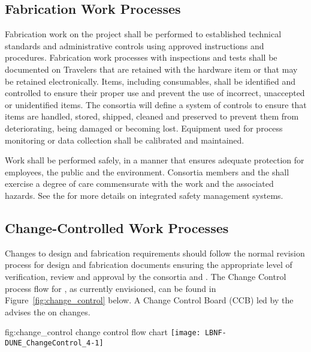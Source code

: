 \subsection{Fabrication Work Processes}

Fabrication work on the  project shall be performed to
established technical standards and administrative controls using
approved instructions and procedures. Fabrication work processes with
 inspections and tests shall be documented on Travelers that
are retained with the hardware item or that may be retained
electronically. Items, including consumables, shall be identified and
controlled to ensure their proper use and prevent the use of
incorrect, unaccepted or unidentified items. The consortia will define
a system of controls to ensure that items are handled, stored,
shipped, cleaned and preserved to prevent them from deteriorating,
being damaged or becoming lost. Equipment used for process monitoring
or data collection shall be calibrated and maintained.

Work shall be performed safely, in a manner that ensures adequate
protection for employees, the public and the environment. Consortia
members and the   shall exercise a degree of
care commensurate with the work and the associated hazards. See the
  for more details on
 integrated safety management systems.

\subsection{Change-Controlled Work Processes}
\label{sec:change-control}

Changes to design and fabrication requirements should follow the
normal revision process for design and fabrication documents ensuring
the appropriate level of verification, review and approval by the
consortia and . The Change Control process flow for
, as currently envisioned, can be found in
Figure~\ref{fig:change_control} below. A Change Control Board (CCB)
led by the  advises the  on changes.
\begin{dunefigure}{fig:change_control}
  { change control flow chart}
  \texttt{[image: LBNF-DUNE\_ChangeControl\_4-1]}
\end{dunefigure}


